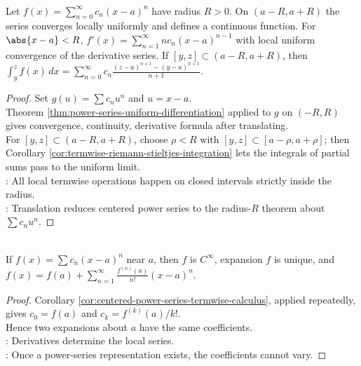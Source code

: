 \begin{corollary} \label{cor:centered-power-series-termwise-calculus} \\
Let $f(x)=\sum\limits_{n=0}^{\infty}c_n(x-a)^n$ have radius $R>0$. On $(a-R,a+R)$ the series converges locally uniformly and defines a continuous function. For $\abs{x-a}<R$, $f'(x)=\sum\limits_{n=1}^{\infty}n c_n(x-a)^{n-1}$ with local uniform convergence of the derivative series. If $[y,z]\subset(a-R,a+R)$, then $\int_y^z f(x)\,dx = \sum\limits_{n=0}^{\infty}c_n\frac{(z-a)^{n+1}-(y-a)^{n+1}}{n+1}$.
\begin{proof}
Set $g(u)=\sum c_nu^n$ and $u=x-a$.\\
Theorem \ref{thm:power-series-uniform-differentiation} applied to $g$ on $(-R,R)$ gives convergence, continuity, derivative formula after translating.\\
For $[y,z]\subset(a-R,a+R)$, choose $\rho<R$ with $[y,z]\subset[a-\rho,a+\rho]$; then Corollary \ref{cor:termwise-riemann-stieltjes-integration} lets the integrals of partial sums pass to the uniform limit.\\
: All local termwise operations happen on closed intervals strictly inside the radius.\\
: Translation reduces centered power series to the radius-$R$ theorem about $\sum c_nu^n$.
\end{proof}
\end{corollary}

\begin{corollary} \label{cor:analytic-functions-smooth-and-unique-taylor} \\
If $f(x)=\sum c_n(x-a)^n$ near $a$, then $f$ is $C^\infty$, expansion $f$ is unique, and $f(x)=f(a)+\sum\limits_{n=1}^{\infty}\frac{f^{(n)}(a)}{n!}(x-a)^n$.
\begin{proof}
Corollary \ref{cor:centered-power-series-termwise-calculus}, applied repeatedly, gives $c_0=f(a)$ and $c_k=f^{(k)}(a)/k!$.\\
Hence two expansions about $a$ have the same coefficients.\\
: Derivatives determine the local series.\\
: Once a power-series representation exists, the coefficients cannot vary.
\end{proof}
\end{corollary}

